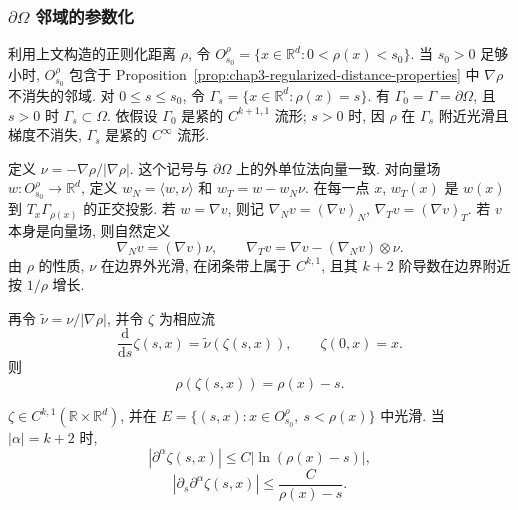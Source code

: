 \subsubsection{$\partial\Omega$ 邻域的参数化}
\label{subsec:chap3-boundary-neighborhood-parametrization}

利用上文构造的正则化距离 $\rho$, 令 $O_{s_0}^\rho=\{x\in\mathbb R^d:0<\rho(x)<s_0\}$. 当 $s_0>0$ 足够小时, $O_{s_0}^\rho$ 包含于 Proposition~\ref{prop:chap3-regularized-distance-properties} 中 $\nabla\rho$ 不消失的邻域. 对 $0\leq s\leq s_0$, 令 $\Gamma_s=\{x\in\mathbb R^d:\rho(x)=s\}$. 有 $\Gamma_0=\Gamma=\partial\Omega$, 且 $s>0$ 时 $\Gamma_s\subset\Omega$. 依假设 $\Gamma_0$ 是紧的 $C^{k+1,1}$ 流形; $s>0$ 时, 因 $\rho$ 在 $\Gamma_s$ 附近光滑且梯度不消失, $\Gamma_s$ 是紧的 $C^\infty$ 流形.

定义
$\nu=-\nabla\rho/|\nabla\rho|$. 这个记号与 $\partial\Omega$ 上的外单位法向量一致. 对向量场 $w:O_{s_0}^\rho\to\mathbb R^d$, 定义 $w_N=\langle w,\nu\rangle$ 和 $w_T=w-w_N\nu$. 在每一点 $x$, $w_T(x)$ 是 $w(x)$ 到 $T_x\Gamma_{\rho(x)}$ 的正交投影. 若 $w=\nabla v$, 则记 $\nabla_Nv=(\nabla v)_N$, $\nabla_Tv=(\nabla v)_T$. 若 $v$ 本身是向量场, 则自然定义
\[
 \nabla_Nv=(\nabla v)\nu,
 \qquad\nabla_Tv=\nabla v-(\nabla_Nv)\otimes\nu.
\]
由 $\rho$ 的性质, $\nu$ 在边界外光滑, 在闭条带上属于 $C^{k,1}$, 且其 $k+2$ 阶导数在边界附近按 $1/\rho$ 增长.

再令 $\widetilde\nu=\nu/|\nabla\rho|$, 并令 $\zeta$ 为相应流
\begin{equation}
 \frac{\mathrm d}{\mathrm ds}\zeta(s,x)=\widetilde\nu(\zeta(s,x)),
 \qquad\zeta(0,x)=x.
 \label{eq:chap3-normalized-normal-flow}
\end{equation}
则
\begin{equation}
 \rho(\zeta(s,x))=\rho(x)-s.
 \label{eq:chap3-distance-along-flow}
\end{equation}

\begin{Proposition}
\label{prop:chap3-normal-flow-regularity}
$\zeta\in C^{k,1}(\mathbb R\times\mathbb R^d)$, 并在 $E=\{(s,x):x\in O_{s_0}^\rho,\ s<\rho(x)\}$ 中光滑. 当 $|\alpha|=k+2$ 时,
\begin{equation}
 |\partial^\alpha\zeta(s,x)|\leq C|\ln(\rho(x)-s)|,
 \label{eq:chap3-flow-high-derivative-log}
\end{equation}
\begin{equation}
 |\partial_s\partial^\alpha\zeta(s,x)|\leq\frac C{\rho(x)-s}.
 \label{eq:chap3-flow-high-derivative-normal}
\end{equation}
\end{Proposition}

